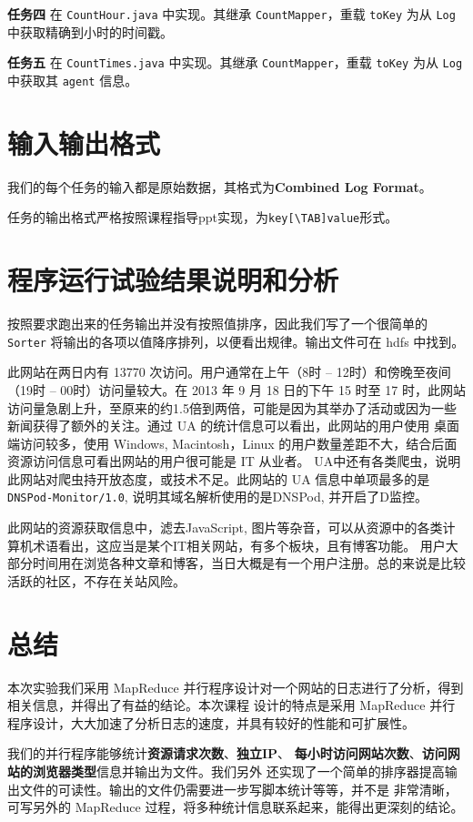 \documentclass{article}
\begin{document}
  \textbf{任务四} 在 \verb|CountHour.java| 中实现。其继承 \verb|CountMapper|，重载 \verb|toKey| 为从
  \verb|Log| 中获取精确到小时的时间戳。
  
  \textbf{任务五} 在 \verb|CountTimes.java| 中实现。其继承 \verb|CountMapper|，重载 \verb|toKey| 为从
  \verb|Log| 中获取其 \verb|agent| 信息。

  \section{输入输出格式}
  我们的每个任务的输入都是原始数据，其格式为\textbf{Combined Log Format}\cite{clf}。

  任务的输出格式严格按照课程指导ppt实现，为\verb|key[\TAB]value|形式。

  \section{程序运行试验结果说明和分析}

  按照要求跑出来的任务输出并没有按照值排序，因此我们写了一个很简单的 \verb|Sorter| 将输出的各项以值降序排列，以便看出规律。输出文件可在 hdfs 中找到。

  此网站在两日内有 13770 次访问。用户通常在上午（8时 -- 12时）和傍晚至夜间（19时 -- 00时）访问量较大。在 2013 年 9 月 18 日的下午 15 时至
   17 时，此网站访问量急剧上升，至原来的约1.5倍到两倍，可能是因为其举办了活动或因为一些新闻获得了额外的关注。通过 UA 的统计信息可以看出，此网站的用户使用
   桌面端访问较多，使用 Windows, Macintosh，Linux 的用户数量差距不大，结合后面资源访问信息可看出网站的用户很可能是 IT 从业者。
   UA中还有各类爬虫，说明此网站对爬虫持开放态度，或技术不足。此网站的 UA 信息中单项最多的是\verb|DNSPod-Monitor/1.0|,
   说明其域名解析使用的是DNSPod, 并开启了D监控。

   此网站的资源获取信息中，滤去JavaScript, 图片等杂音，可以从资源中的各类计算机术语看出，这应当是某个IT相关网站，有多个板块，且有博客功能。
   用户大部分时间用在浏览各种文章和博客，当日大概是有一个用户注册。总的来说是比较活跃的社区，不存在关站风险。

  \section{总结}
  本次实验我们采用 MapReduce 并行程序设计对一个网站的日志进行了分析，得到相关信息，并得出了有益的结论。本次课程
  设计的特点是采用 MapReduce 并行程序设计，大大加速了分析日志的速度，并具有较好的性能和可扩展性。
  
  我们的并行程序能够统计\textbf{资源请求次数}、\textbf{独立IP}、
  \textbf{每小时访问网站次数}、\textbf{访问网站的浏览器类型}信息并输出为文件。我们另外
  还实现了一个简单的排序器提高输出文件的可读性。输出的文件仍需要进一步写脚本统计等等，并不是
  非常清晰，可写另外的 MapReduce 过程，将多种统计信息联系起来，能得出更深刻的结论。
\end{document}
